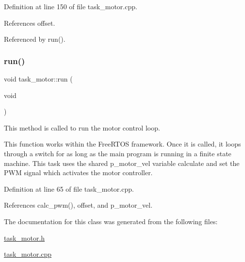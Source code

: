 Definition at line 150 of file task\+\_\+motor.\+cpp.



References offset.



Referenced by run().

\mbox{\label{classtask__motor_a895a075ec470c9d5a07b8959de06aacd}} 
\subsubsection{\texorpdfstring{run()}{run()}}
{\footnotesize\ttfamily void task\+\_\+motor\+::run (\begin{DoxyParamCaption}\item[{void}]{ }\end{DoxyParamCaption})}



This method is called to run the motor control loop. 

This function works within the Free\+R\+T\+OS framework. Once it is called, it loops through a switch for as long as the main program is running in a finite state machine. This task uses the shared p\+\_\+motor\+\_\+vel variable calculate and set the P\+WM signal which activates the motor controller. 

Definition at line 65 of file task\+\_\+motor.\+cpp.



References calc\+\_\+pwm(), offset, and p\+\_\+motor\+\_\+vel.



The documentation for this class was generated from the following files\+:\begin{DoxyCompactItemize}
\item 
\mbox{\hyperlink{task__motor_8h}{task\+\_\+motor.\+h}}\item 
\mbox{\hyperlink{task__motor_8cpp}{task\+\_\+motor.\+cpp}}\end{DoxyCompactItemize}
